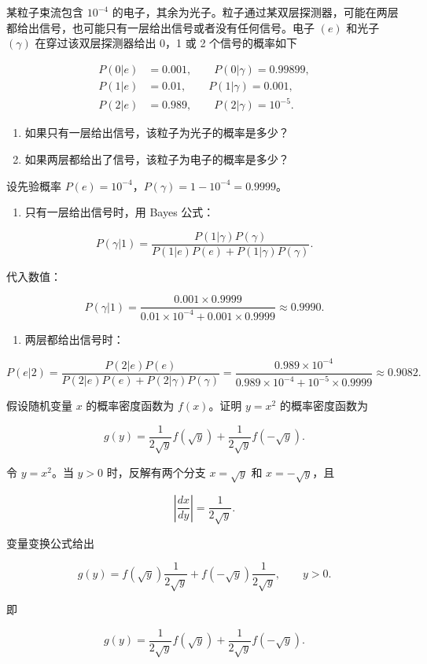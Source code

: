 \begin{question}
某粒子束流包含 \(10^{-4}\) 的电子，其余为光子。粒子通过某双层探测器，可能在两层都给出信号，也可能只有一层给出信号或者没有任何信号。电子 \((e)\) 和光子 \((\gamma)\) 在穿过该双层探测器给出 0，1 或 2 个信号的概率如下

\[
\begin{split}
P(0|e)&=0.001,\qquad P(0|\gamma)=0.99899,\\
P(1|e)&=0.01,\qquad P(1|\gamma)=0.001,\\
P(2|e)&=0.989,\qquad P(2|\gamma)=10^{-5}.
\end{split}
\]

\begin{enumerate}
\item
  如果只有一层给出信号，该粒子为光子的概率是多少？
\item
  如果两层都给出了信号，该粒子为电子的概率是多少？
\end{enumerate}
\begin{solution}
设先验概率 \(P(e)=10^{-4}\)，\(P(\gamma)=1-10^{-4}=0.9999\)。

\begin{enumerate}
\item
  只有一层给出信号时，用 Bayes 公式：
\end{enumerate}

\[
P(\gamma|1)=\frac{P(1|\gamma)P(\gamma)}{P(1|e)P(e)+P(1|\gamma)P(\gamma)}.
\]

代入数值：

\[
P(\gamma|1)=\frac{0.001\times0.9999}{0.01\times10^{-4}+0.001\times0.9999}
\approx0.9990.
\]

\begin{enumerate}[start=2]
\item
  两层都给出信号时：
\end{enumerate}

\[
P(e|2)=\frac{P(2|e)P(e)}{P(2|e)P(e)+P(2|\gamma)P(\gamma)}
=\frac{0.989\times10^{-4}}{0.989\times10^{-4}+10^{-5}\times0.9999}
\approx0.9082.
\]
\end{solution}
\end{question}


\begin{question}
假设随机变量 \(x\) 的概率密度函数为 \(f(x)\)。证明 \(y=x^2\) 的概率密度函数为

\[
g(y)=\frac{1}{2\sqrt{y}}f(\sqrt{y})+\frac{1}{2\sqrt{y}}f(-\sqrt{y}).
\]
\begin{solution}
令 \(y=x^2\)。当 \(y>0\) 时，反解有两个分支 \(x=\sqrt y\) 和
\(x=-\sqrt y\)，且

\[
\left|\frac{dx}{dy}\right|=\frac{1}{2\sqrt y}.
\]

变量变换公式给出

\[
g(y)=f(\sqrt y)\frac{1}{2\sqrt y}+f(-\sqrt y)\frac{1}{2\sqrt y},\qquad y>0.
\]

即

\[
g(y)=\frac{1}{2\sqrt y}f(\sqrt y)+\frac{1}{2\sqrt y}f(-\sqrt y).
\]
\end{solution}
\end{question}


